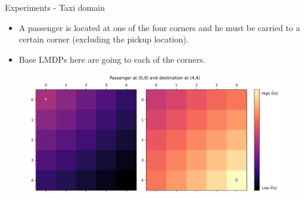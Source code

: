 \documentclass{beamer}
\theoremstyle{mystyle}
\begin{document}
\begin{frame}{Experiments - Taxi domain}
    
    \begin{itemize}
    \item A passenger is located at one of the four corners and he must be carried to a certain corner (excluding the pickup location).
    \item Base LMDPs here are going to each of the corners.
\end{itemize}

    \begin{figure}[H]
    \centering
    \includegraphics[scale=0.35]{Figures/taxi_dom_VF.png}
    
    \label{fig:vf_taxi}
    \end{figure}

\end{frame}
\end{document}
